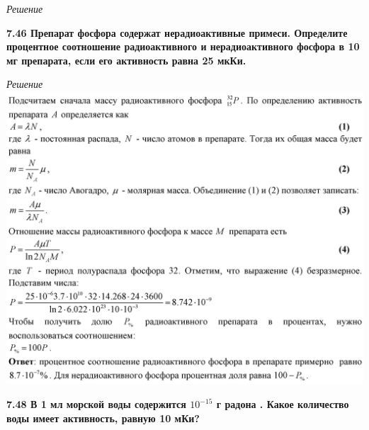 \documentclass[a4paper, fontsize=14pt]{extreport}
\begin{document}
{\textit{Решение \\
%
}

\textbf{7.46 Препарат фосфора  содержат нерадиоактивные примеси. Определите процентное соотношение радиоактивного и нерадиоактивного фосфора в 10 мг препарата, если его активность равна 25 мкКи.}

\textit{Решение \\
%
}
\includegraphics[width=\textwidth]{746}

\textbf{7.48 В 1 мл морской воды содержится $10^{-15}$ г радона . Какое количество воды имеет активность, равную 10 мКи?}

}
\end{document}
